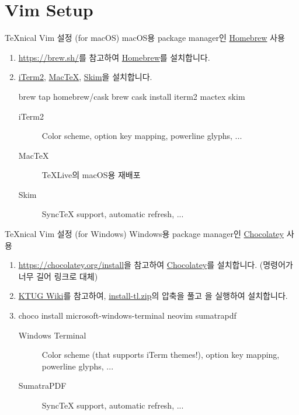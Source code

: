 \documentclass{beamer}
\begin{document}
\section{Vim Setup}

\begin{frame}[fragile]{\TeX{}nical Vim 설정 (for macOS)}
  macOS용 package manager인 \href{https://brew.sh/}{Homebrew} 사용
  \begin{enumerate}
    \item \url{https://brew.sh/}를 참고하여 \href{https://brew.sh/}{Homebrew}를 설치합니다.
    \item \href{https://iterm2.com/}{iTerm2},
      \href{https://www.tug.org/mactex/}{Mac\TeX},
      \href{https://skim-app.sourceforge.io/}{Skim}을 설치합니다.
      \begin{shellcode}
        brew tap homebrew/cask
        brew cask install iterm2 mactex skim
      \end{shellcode}
      \begin{description}
        \item[iTerm2] Color scheme, \alert{option key mapping}, powerline
          glyphs, ...
        \item[Mac\TeX] \TeX{}Live의 macOS용 재배포
        \item[Skim] Sync\TeX{} support, automatic refresh, ...
      \end{description}
  \end{enumerate}
\end{frame}

\begin{frame}[fragile]{\TeX{}nical Vim 설정 (for Windows)}
  Windows용 package manager인 \href{https://chocolatey.org/}{Chocolatey} 사용
  \begin{enumerate}
    \item \url{https://chocolatey.org/install}을 참고하여
      \href{https://chocolatey.org/}{Chocolatey}를 설치합니다. (명령어가 너무
      길어 링크로 대체)
    \item \href{http://wiki.ktug.org/wiki/wiki.php}{KTUG Wiki}를 참고하여,
      \href{http://mirror.navercorp.com/CTAN/systems/texlive/tlnet/install-tl.zip}{install-tl.zip}의
      압축을 풀고 을 실행하여 설치합니다.
    \item 
      \begin{shellcode}
        choco install microsoft-windows-terminal neovim sumatrapdf
      \end{shellcode}
      \begin{description}
        \item[Windows Terminal] Color scheme (that supports iTerm themes!),
          \alert{option key mapping}, powerline glyphs, ...
        \item[SumatraPDF] Sync\TeX{} support, automatic refresh, ...
      \end{description}
  \end{enumerate}
\end{frame}
\end{document}

